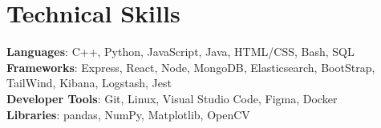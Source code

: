 \documentclass[a4paper,20pt]{article}
\begin{document}
%
\section{Technical Skills}
 \begin{itemize}[leftmargin=0.15in, label={}]
    \small{\item{
     \textbf{Languages}{: C++, Python, JavaScript, Java, HTML/CSS, Bash, SQL} \\
     \textbf{Frameworks}{: Express, React, Node, MongoDB, Elasticsearch, BootStrap, TailWind, Kibana, Logstash, Jest } \\
     \textbf{Developer Tools}{: Git, Linux, Visual Studio Code, Figma, Docker } \\
     \textbf{Libraries}{: pandas, NumPy, Matplotlib, OpenCV} \\
    }}
 \end{itemize}
 \vspace{-16pt}

\end{document}
